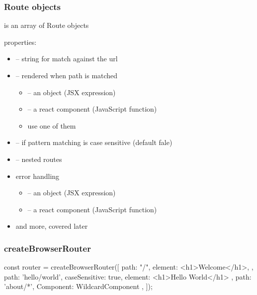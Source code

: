 \begin{frame}[fragile] \frametitle{Route objects}
 is an array of Route objects

properties:
\begin{itemize}
  \item {} -- string for match against the url
  \item {}  -- rendered when path is matched
  \begin{itemize}
    \item {} -- an object (JSX expression)
    \item {} -- a react component (JavaScript function)
    \item use one of them
  \end{itemize}
  \item {}  -- if pattern matching is case sensitive (default fale)
  \item {} -- nested routes
  \item error handling
  \begin{itemize}
    \item {} -- an object (JSX expression)
    \item {} -- a react component (JavaScript function)
  \end{itemize}
  \item and more, covered later
\end{itemize}
\end{frame}

\begin{frame}[fragile] \frametitle{createBrowserRouter}
\begin{CodeBox}{}
const router = createBrowserRouter([
  {
    path: "/",
    element: <h1>Welcome</h1>,
  }, {
    path: 'hello/world',
    caseSensitive: true,
    element: <h1>Hello World</h1>
  }, {
    path: 'about/*',
    Component: {WildcardComponent}
  },
]);

\end{CodeBox}
\end{frame}

